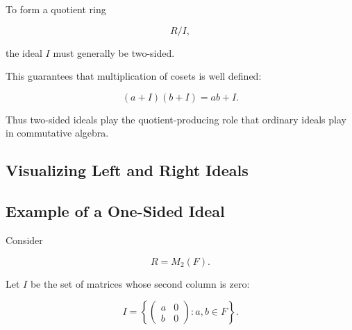 To form a quotient ring

\[ R/I, \]

the ideal \(I\) must generally be two-sided.

This guarantees that multiplication of cosets is well defined:

\[ (a+I)(b+I)=ab+I. \]

Thus two-sided ideals play the quotient-producing role that ordinary ideals
play in commutative algebra.

\subsection{Visualizing Left and Right Ideals}
\label{subsec:left-right-ideal-visual}

\begin{center}
\end{center}

\subsection{Example of a One-Sided Ideal}
\label{subsec:one-sided-ideal-example}

Consider

\[ R=M_2(F). \]

Let \(I\) be the set of matrices whose second column is zero:

\[ I=\left\{
\begin{pmatrix}
a&0\\
b&0
\end{pmatrix}:a,b\in F
\right\}. \]

